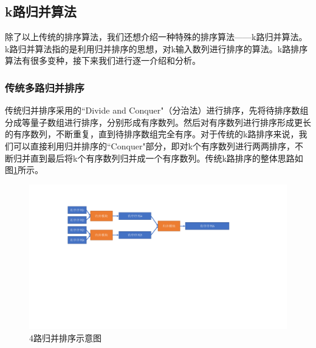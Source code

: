 \subsection{k路归并算法}
除了以上传统的排序算法，我们还想介绍一种特殊的排序算法——k路归并算法。k路归并算法指的是利用归并排序的思想，对k输入数列进行排序的算法。k路排序算法有很多变种，接下来我们进行逐一介绍和分析。
\subsubsection{传统多路归并排序}

传统归并排序采用的``Divide and Conquer"（分治法）进行排序，先将待排序数组分成等量子数组进行排序，分别形成有序数列。然后对有序数列进行排序形成更长的有序数列，不断重复，直到待排序数组完全有序。对于传统的k路排序来说，我们可以直接利用归并排序的``Conquer"部分，即对k个有序数列进行两两排序，不断归并直到最后将k个有序数列归并成一个有序数列。传统k路排序的整体思路如图\ref{fig:traditional_k_way_sort}所示。

\begin{figure}[htbp]
    \centering
    \includegraphics[width=\linewidth]{figures/traditional k way sort.pdf}
    \caption{4路归并排序示意图}
    \label{fig:traditional_k_way_sort}
\end{figure}

